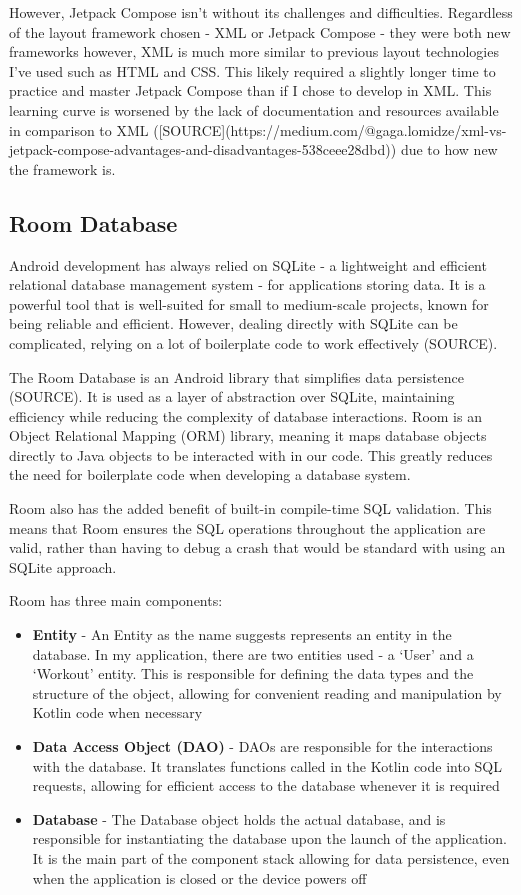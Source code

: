 \documentclass{l4proj}
\begin{document}
However, Jetpack Compose isn’t without its challenges and difficulties. Regardless of the layout framework chosen - XML or Jetpack Compose - they were both new frameworks however, XML is much more similar to previous layout technologies I’ve used such as HTML and CSS. This likely required a slightly longer time to practice and master Jetpack Compose than if I chose to develop in XML. This learning curve is worsened by the lack of documentation and resources available in comparison to XML ([SOURCE](https://medium.com/@gaga.lomidze/xml-vs-jetpack-compose-advantages-and-disadvantages-538ceee28dbd)) due to how new the framework is.

\subsection{Room Database}
\label{sec:room}

Android development has always relied on SQLite - a lightweight and efficient relational database management system - for applications storing data. It is a powerful tool that is well-suited for small to medium-scale projects, known for being reliable and efficient. However, dealing directly with SQLite can be complicated, relying on a lot of boilerplate code to work effectively (SOURCE).

The Room Database is an Android library that simplifies data persistence (SOURCE). It is used as a layer of abstraction over SQLite, maintaining efficiency while reducing the complexity of database interactions. Room is an Object Relational Mapping (ORM) library, meaning it maps database objects directly to Java objects to be interacted with in our code. This greatly reduces the need for boilerplate code when developing a database system. 

Room also has the added benefit of built-in compile-time SQL validation. This means that Room ensures the SQL operations throughout the application are valid, rather than having to debug a crash that would be standard with using an SQLite approach.

Room has three main components:

\begin{itemize}
    \item \textbf{Entity} - An Entity as the name suggests represents an entity in the database. In my application, there are two entities used - a ‘User’ and a ‘Workout’ entity. This is responsible for defining the data types and the structure of the object, allowing for convenient reading and manipulation by Kotlin code when necessary
    \item \textbf{Data Access Object (DAO)} - DAOs are responsible for the interactions with the database. It translates functions called in the Kotlin code into SQL requests, allowing for efficient access to the database whenever it is required
    \item \textbf{Database} - The Database object holds the actual database, and is responsible for instantiating the database upon the launch of the application. It is the main part of the component stack allowing for data persistence, even when the application is closed or the device powers off
\end{itemize}
\end{document}
